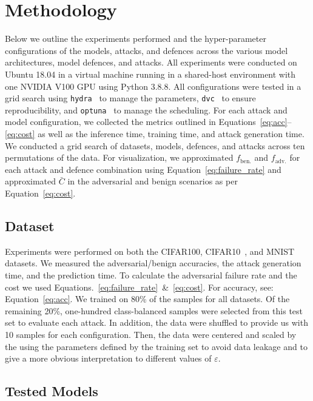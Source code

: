 \section{Methodology}
\label{methods}
Below we outline the experiments performed and the hyper-parameter configurations of the models, attacks, and defences across the various model architectures, model defences, and attacks. All experiments were conducted on Ubuntu 18.04 in a virtual machine running in a shared-host environment with one NVIDIA V100 GPU using Python 3.8.8. All configurations were tested in a grid search using \texttt{hydra}~\cite{hydra} to manage the parameters, \texttt{dvc}~\cite{dvc} to ensure reproducibility, and \texttt{optuna}~\cite{optuna} to manage the scheduling. For each attack and model configuration, we collected the metrics outlined in Equations~\ref{eq:acc}--\ref{eq:cost} as well as the inference time, training time, and attack generation time. We conducted a grid search of datasets, models, defences, and attacks across ten permutations of the data. For visualization, we approximated $f_{\mathrm{ben.}}$ and $f_{\mathrm{adv.}}$ for each attack and defence combination using Equation~\ref{eq:failure_rate} and approximated $\bar{C}$ in the adversarial and benign scenarios as per Equation~\ref{eq:cost}.


\subsection{Dataset}
\label{dataset}

Experiments were performed on both the CIFAR100, CIFAR10~\cite{cifar}, and MNIST~\cite{mnist} datasets. We measured the adversarial/benign accuracies, the attack generation time, and the prediction time. To calculate the adversarial failure rate and the cost we used Equations.~\ref{eq:failure_rate}~\&~\ref{eq:cost}. For accuracy, see: Equation~\ref{eq:acc}. We trained on 80\% of the samples for all datasets. Of the remaining 20\%, one-hundred class-balanced samples were selected from this test set to evaluate each attack. In addition, the data were shuffled to provide us with 10 samples for each configuration. Then, the data were centered and scaled by the using the parameters defined by the training set to avoid data leakage and to give a more obvious interpretation to different values of $\varepsilon$.


\subsection{Tested Models}
\label{models}

